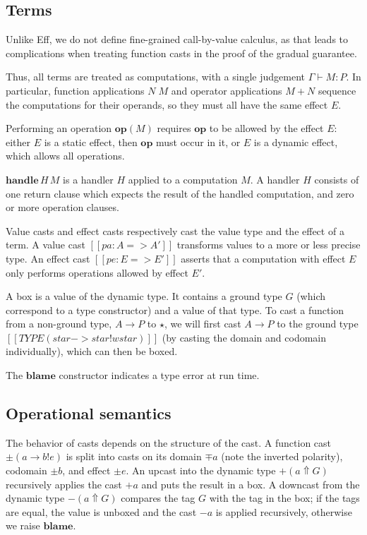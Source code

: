 \subsection{Terms}

Unlike Eff, we do not define fine-grained call-by-value calculus, as that leads
to complications when treating function casts in the proof of the gradual guarantee.

Thus, all terms are treated as computations, with a single judgement $\Gamma \vdash M : P$.
In particular, function applications $N\;M$ and operator applications $M + N$
sequence the computations for their operands, so they must all have the same
effect $E$.

Performing an operation $\mathbf{op}(M)$ requires $\mathbf{op}$ to be allowed
by the effect $E$: either $E$ is a static effect, then $\mathbf{op}$ must occur
in it, or $E$ is a dynamic effect, which allows all operations.

$\mathbf{handle}\,H\,M$ is a handler $H$ applied to a computation $M$.
A handler $H$ consists of one return clause which expects the result of the
handled computation, and zero or more operation clauses.

Value casts and effect casts respectively cast the value type and the effect of a term.
A value cast $[[pa : A => A']]$ transforms values to a more or less precise type.
An effect cast $[[pe : E => E']]$ asserts that a computation with effect $E$
only performs operations allowed by effect $E'$.

A box is a value of the dynamic type. It contains a ground type $G$
(which correspond to a type constructor) and a value of that type.
To cast a function from a non-ground type, $A \to P$ to $\star$,
we will first cast $A \to P$ to the ground type
$[[TYPE ( star -> star ! wstar )]]$ (by casting the domain and codomain individually),
which can then be boxed.

The $\mathbf{blame}$ constructor indicates a type error at run time.

\subsection{Operational semantics}

The behavior of casts depends on the structure of the cast.
A function cast $\pm (a \to b ! e)$
is split into casts on its domain $\mp a$ (note the inverted polarity), codomain $\pm b$, and effect $\pm e$.
An upcast into the dynamic type $+ (a \Uparrow G)$
recursively applies the cast $+ a$ and puts the result in a box.
A downcast from the dynamic type $- (a \Uparrow G)$ compares
the tag $G$ with the tag in the box; if the tags are equal, the value is
unboxed and the cast $- a$ is applied recursively,
otherwise we raise $\mathbf{blame}$.

